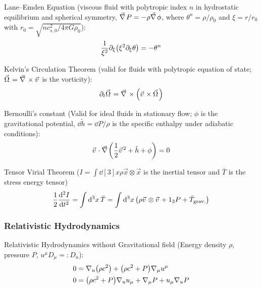 			\noindent
			Lane--Emden Equation (viscous fluid with polytropic index $n$ in hydrostatic equilibrium and spherical symmetry, \ie $\Nabla P = - \rho \Nabla \phi$, where $\theta^n = \rho/\rho_0$ and $\xi = r/r_0$ with $r_0 = \sqrt{n c_{s,0}^2 / 4\pi G \rho_0}$):
			\begin{equation}
				\frac{1}{\xi^2} \partial_\xi \qty(\xi^2 \partial_\xi \theta) = - \theta^n
			\end{equation}

			\noindent
			Kelvin's Circulation Theorem (valid for fluids with polytropic equation of state; $\vec{\Omega} = \Nabla \times \vec{v}$ is the vorticity):
			\begin{equation}
				\partial_t \vec{\Omega} = \Nabla \times \qty(\vec{v} \times \vec{\Omega})
			\end{equation}

			\noindent
			Bernoulli's constant (Valid for ideal fluids in stationary flow; $\phi$ is the gravitational potential, $\dd \tilde{h} = \dd P / \rho$ is the specific enthalpy under adiabatic conditions):
			\begin{equation}
				\vec{v}\cdot \Nabla \qty(\frac{1}{2}\vec{v}^2 + \tilde{h} + \phi) = 0
			\end{equation}

			\noindent
			Tensor Virial Theorem ($I = 	\int \dd[3]{x} \rho \vec{x} \otimes \vec{x}$ is the inertial tensor and $\bar{T}$ is the stress energy tensor)
			\begin{equation}
				\frac{1}{2}\dv[2]{I}{t}
				= \int \dd[3]{x} \bar{T}
				= \int \dd[3]{x} \qty(\rho \vec{v}\otimes\vec{v} + 1_3 P + \bar{T}_{\text{grav.}})
			\end{equation}

		\subsubsection{Relativistic Hydrodynamics}
			Relativistic Hydrodynamics without Gravitational field (Energy density $\rho$, pressure $P$, $u^\mu D_\mu =: D_u$):
			\begin{equation}
				\begin{aligned}
					0 &= \nabla_u \qty(\rho c^2) + \qty(\rho c^2 + P) \nabla_\mu u^\mu \\
					0 &= \qty(\rho c^2 + P) \nabla_u u_\mu + \nabla_\mu P + u_\mu \nabla_u P \\
				\end{aligned}
			\end{equation}

